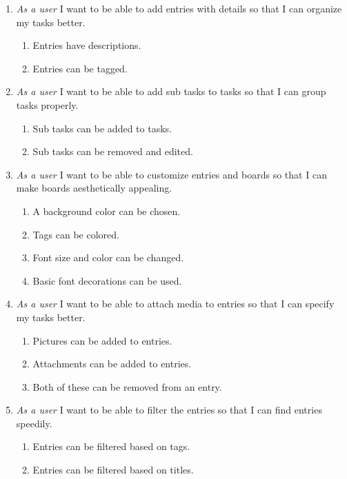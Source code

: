\documentclass{article}
\begin{document}
	\begin{enumerate}
		\item \emph{As a user} I want to be able to add entries with details so that I can organize my tasks better.
			\begin{enumerate}
				\item Entries have descriptions.
				\item Entries can be tagged.
			\end{enumerate}

		\item \emph{As a user} I want to be able to add sub tasks to tasks so that I can group tasks properly.
			\begin{enumerate}
				\item Sub tasks can be added to tasks.
				\item Sub tasks can be removed and edited.
			\end{enumerate}
		
		\item \emph{As a user} I want to be able to customize entries and boards so that I can make boards aesthetically appealing.
			\begin{enumerate}
				\item A background color can be chosen.
				\item Tags can be colored.
				\item Font size and color can be changed.
				\item Basic font decorations can be used.
			\end{enumerate}

		\item \emph{As a user} I want to be able to attach media to entries so that I can specify my tasks better.
			\begin{enumerate}
				\item Pictures can be added to entries.
				\item Attachments can be added to entries.
				\item Both of these can be removed from an entry.
			\end{enumerate}

		\item \emph{As a user} I want to be able to filter the entries so that I can find entries speedily.
			\begin{enumerate}
				\item Entries can be filtered based on tags.
				\item Entries can be filtered based on titles.
			\end{enumerate}
	\end{enumerate}
\end{document}
